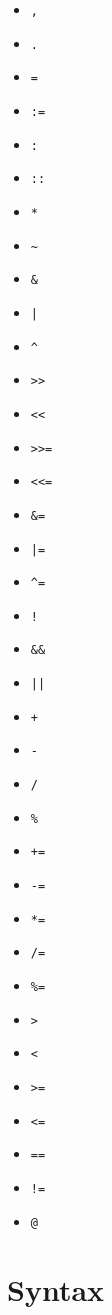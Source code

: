 \documentclass[a4paper]{article}
\begin{document}
\begin{itemize}
    \item \verb|,|
    \item \verb|.|
    \item \verb|=|
    \item \verb|:=|
    \item \verb|:|
    \item \verb|::|
    \item \verb|*|
    \item \verb|~|
    \item \verb|&|
    \item \verb/|/
    \item \verb|^|
    \item \verb|>>|
    \item \verb|<<|
    \item \verb|>>=|
    \item \verb|<<=|
    \item \verb|&=|
    \item \verb/|=/
    \item \verb|^=|
    \item \verb|!|
    \item \verb|&&|
    \item \verb/||/
    \item \verb|+|
    \item \verb|-|
    \item \verb|/|
    \item \verb|%|
    \item \verb|+=|
    \item \verb|-=|
    \item \verb|*=|
    \item \verb|/=|
    \item \verb|%=|
    \item \verb|>|
    \item \verb|<|
    \item \verb|>=|
    \item \verb|<=|
    \item \verb|==|
    \item \verb|!=|
    \item \verb|@|
\end{itemize}

\pagebreak

\section{Syntax}
\end{document}
